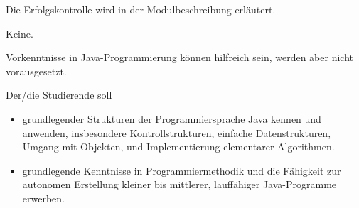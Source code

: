 \begin{course}

\setdoclanguagegerman
{}



\coursehead


\label{cour_6247.dp_997}


\begin{styleenv}
\begin{assessment}
Die Erfolgskontrolle wird in der Modulbeschreibung erläutert.


\end{assessment}

\begin{conditions}Keine.\end{conditions}

\begin{recommendations}Vorkenntnisse in Java-Programmierung können hilfreich sein, werden aber nicht vorausgesetzt.

\end{recommendations}
\end{styleenv}

\begin{learningoutcomes}
Der/die Studierende soll

 \begin{itemize}\item grundlegender Strukturen der Programmiersprache Java kennen und anwenden, insbesondere Kontrollstrukturen, einfache Datenstrukturen, Umgang mit Objekten, und Implementierung elementarer Algorithmen.  \item grundlegende Kenntnisse in Programmiermethodik und die Fähigkeit zur autonomen Erstellung kleiner bis mittlerer, lauffähiger Java-Programme erwerben.  \end{itemize}
\end{learningoutcomes}


\end{course}
